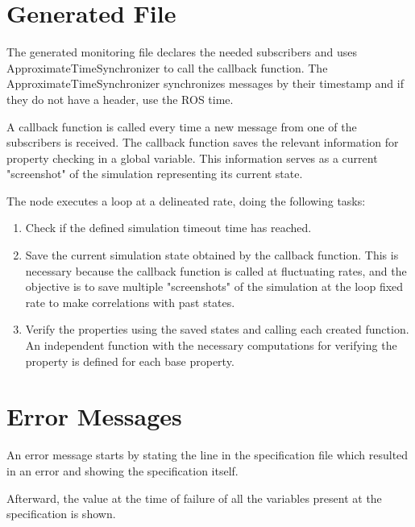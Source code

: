 \section{Generated File}
\label{sec:generatedfile}

The generated monitoring file declares the needed subscribers and uses ApproximateTimeSynchronizer to call the callback function. The ApproximateTimeSynchronizer synchronizes messages by their timestamp and if they do not have a header, use the ROS time.

A callback function is called every time a new message from one of the subscribers is received. The callback function saves the relevant information for property checking in a global variable. This information serves as a current "screenshot" of the simulation representing its current state.

The node executes a loop at a delineated rate, doing the following tasks:

\begin{enumerate}
    \item Check if the defined simulation timeout time has reached.
    \item Save the current simulation state obtained by the callback function. This is necessary because the callback function is called at fluctuating rates, and the objective is to save multiple "screenshots" of the simulation at the loop fixed rate to make correlations with past states.
    \item Verify the properties using the saved states and calling each created function. An independent function with the necessary computations for verifying the property is defined for each base property.
\end{enumerate}


\section{Error Messages}
\label{sec:errormessages}

An error message starts by stating the line in the specification file which resulted in an error and showing the specification itself.

Afterward, the value at the time of failure of all the variables present at the specification is shown.


